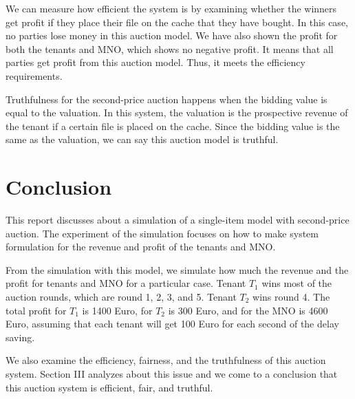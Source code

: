 \documentclass[conference]{IEEEtran}
\begin{document}
We can measure how efficient the system is by examining whether the winners get profit if they place their file on the cache that they have bought.
In this case, no parties lose money in this auction model.
We have also shown the profit for both the tenants and MNO, which shows no negative profit.
It means that all parties get profit from this auction model.
Thus, it meets the efficiency requirements.

Truthfulness for the second-price auction happens when the bidding value is equal to the valuation.
In this system, the valuation is the prospective revenue of the tenant if a certain file is placed on the cache.
Since the bidding value is the same as the valuation, we can say this auction model is truthful.

\section{Conclusion}\label{sec:conclusion}
This report discusses about a simulation of a single-item model with second-price auction.
The experiment of the simulation focuses on how to make system formulation for the revenue and profit of the tenants and MNO.

From the simulation with this model, we simulate how much the revenue and the profit for tenants and MNO for a particular case.
Tenant $T_1$ wins most of the auction rounds, which are round 1, 2, 3, and 5.
Tenant $T_2$ wins round 4. The total profit for $T_1$ is 1400 Euro, for $T_2$ is 300 Euro, and for the MNO is 4600 Euro, assuming that each tenant will get 100 Euro for each second of the delay saving. 

We also examine the efficiency, fairness, and the truthfulness of this auction system.
Section III analyzes about this issue and we come to a conclusion that this auction system is efficient, fair, and truthful.



\end{document}
